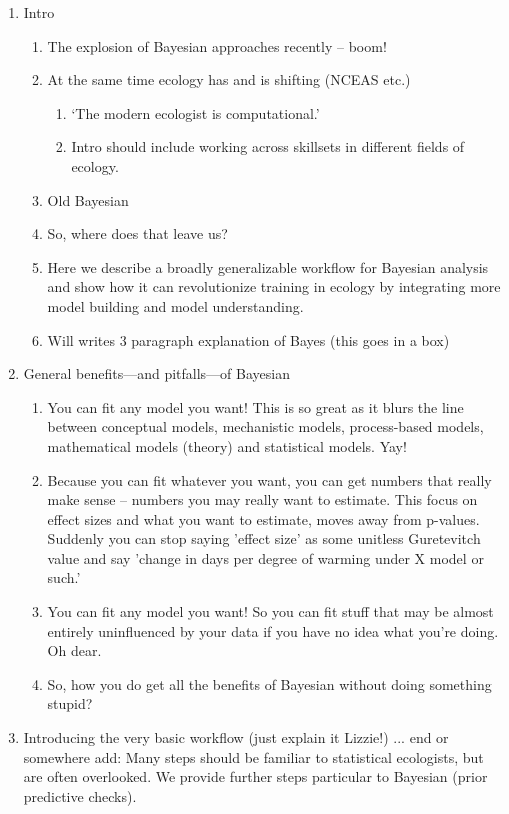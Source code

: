 \documentclass[11pt]{article}
\begin{document}
\begin{enumerate}
\item Intro 
\begin{enumerate}
\item The explosion of Bayesian approaches recently -- boom!
\item At the same time ecology has and is shifting (NCEAS etc.)
\begin{enumerate}
\item `The modern ecologist is computational.' 
\item Intro should include working across skillsets in different fields of ecology.
\end{enumerate}
\item Old Bayesian
\item So, where does that leave us?
\item Here we describe a broadly generalizable workflow for Bayesian analysis and show how it can revolutionize training in ecology by integrating more model building and model understanding. 
\item Will writes 3 paragraph explanation of Bayes (this goes in a box)
\end{enumerate}
\item General benefits---and pitfalls---of Bayesian 
\begin{enumerate}
\item You can fit any model you want! This is so great as it blurs the line between conceptual models, mechanistic models, process-based models, mathematical models (theory) and statistical models. Yay!
\item Because you can fit whatever you want, you can get numbers that really make sense -- numbers you may really want to estimate. This focus on effect sizes and what you want to estimate, moves away from p-values. Suddenly you can stop saying 'effect size' as some unitless Guretevitch value and say 'change in days per degree of warming under X model or such.' 
\item You can fit any model you want! So you can fit stuff that may be almost entirely uninfluenced by your data if you have no idea what you're doing. Oh dear.
\item So, how you do get all the benefits of Bayesian without doing something stupid?  
\end{enumerate}
\item Introducing the very basic workflow (just explain it Lizzie!) ... end or somewhere add: Many steps should be familiar to statistical ecologists, but are often overlooked. We provide further steps particular to Bayesian (prior predictive checks).

\end{enumerate}
\end{document}
